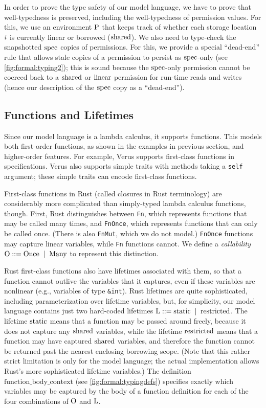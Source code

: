 In order to prove the type safety of our model language,
we have to prove that well-typedness is preserved, including the well-typedness of permission values.
For this, we use an environment $\textrm{P}$ that keeps track of whether each storage location $i$
is currently linear or borrowed ($\textrm{shared}$).
We also need to type-check the snapshotted $\textrm{spec}$ copies of permissions.
For this, we provide a special ``dead-end'' rule that allows stale copies of a permission
to persist as $\textrm{spec}$-only (see \autoref{fig:formal:typing2});
this is sound because the $\textrm{spec}$-only permission cannot be coerced
back to a $\textrm{shared}$ or $\textrm{linear}$ permission for run-time reads and writes
(hence our description of the $\textrm{spec}$ copy as a ``dead-end'').

\subsection{Functions and Lifetimes}

Since our model language is a lambda calculus,
it supports functions.
This models both first-order functions,
as shown in the examples in previous section,
and higher-order features.
For example, Verus supports first-class functions in specifications.
Verus also supports simple traits with methods taking a \verb`self` argument;
these simple traits can encode first-class functions.

First-class functions in Rust (called closures in Rust terminology)
are considerably more complicated
than simply-typed lambda calculus functions, though.
First, Rust distinguishes between \verb`Fn`,
which represents functions that may be called many times,
and \verb`FnOnce`,
which represents functions that can only be called once.
(There is also \verb`FnMut`, which we do not model.)
\verb`FnOnce` functions may capture linear variables,
while \verb`Fn` functions cannot.
We define a {\it callability} $\textrm{O} ::= \textrm{Once} \;\mid\; \textrm{Many}$
to represent this distinction.

Rust first-class functions also have lifetimes associated with them,
so that a function cannot outlive the variables that it captures,
even if these variables are nonlinear (e.g., variables of type \verb`&int`).
Rust lifetimes are quite sophisticated, including parameterization over lifetime variables,
but, for simplicity,
our model language contains just two hard-coded lifetimes
$\textrm{L} ::= \textrm{static} \;\mid\; \textrm{restricted}$.
The lifetime $\textrm{static}$ means that a function may be passed around freely,
because it does not capture any $\textrm{shared}$ variables,
while the lifetime $\textrm{restricted}$ means that a function may have captured $\textrm{shared}$ variables,
and therefore the function cannot be returned past the nearest enclosing borrowing scope.
(Note that this rather strict limitation is only for the model language;
the actual \verus implementation allows Rust's more sophisticated lifetime variables.)
The definition $\textrm{function\_body\_context}$ (see \autoref{fig:formal:typingdefs})
specifies exactly which variables may be captured by the body of a function definition
for each of the four combinations of $\textrm{O}$ and $\textrm{L}$.

